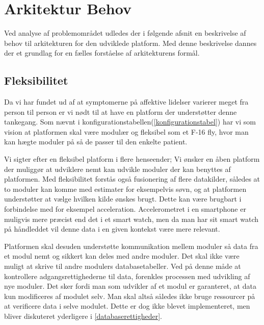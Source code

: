 \section{Arkitektur Behov}\label{arkitekturkrav}
Ved analyse af problemområdet udledes der i følgende afsnit en beskrivelse af behov til arkitekturen for den udviklede platform.
Med denne beskrivelse dannes der et grundlag for en fælles forståelse af arkitekturens formål.

\subsection{Fleksibilitet}
Da vi har fundet ud af at symptomerne på affektive lidelser varierer meget fra person til person er vi nødt til at have en platform der understøtter denne tankegang.
Som nævnt i konfigurationstabellen(\cref{konfigurationstabel}) har vi som vision at platformen skal være modulær og fleksibel som et F-16 fly, hvor man kan hægte moduler på så de passer til den enkelte patient.

Vi sigter efter en fleksibel platform i flere henseender;
Vi ønsker en åben platform der muliggør at udviklere nemt kan udvikle moduler der kan benyttes af platformen.
Med fleksibilitet forstås også fusionering af flere datakilder, således at to moduler kan komme med estimater for eksempelvis søvn, og at platformen understøtter at vælge hvilken kilde ønskes brugt.
Dette kan være brugbart i forbindelse med for eksempel acceleration.
Accelerometret i en smartphone er muligvis mere præcist end det i et smart watch, men da man har sit smart watch på håndleddet vil denne data i en given kontekst være mere relevant.

Platformen skal desuden understøtte kommunikation mellem moduler så data fra et modul nemt og sikkert kan deles med andre moduler.
Det skal ikke være muligt at skrive til andre modulers databasetabeller.
Ved på denne måde at kontrollere adgangsrettighederne til data, forenkles processen med udvikling af nye moduler.
Det sker fordi man som udvikler af et modul er garanteret, at data kun modificeres af modulet selv.
Man skal altså således ikke bruge ressourcer på at verificere data i selve modulet.
Dette er dog ikke blevet implementeret, men bliver diskuteret yderligere i \cref{databaserettigheder}.
